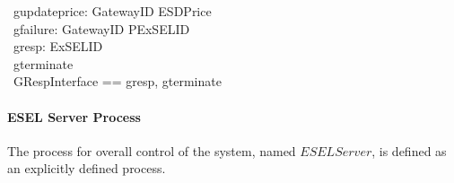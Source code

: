


\begin{circus}
	\circchannel\ gupdateprice: GatewayID \cross ESDPrice \\
	\circchannel\ gfailure: GatewayID \cross PExSELID \\
	\circchannel\ gresp: ExSELID \\
	\circchannel\ gterminate \\
    \circchannelset\ GRespInterface == \lchanset gresp, gterminate \rchanset
\end{circus}

\paragraph{ESEL Server Process}
The process for overall control of the system, named $ESELServer$, is defined as an explicitly defined process.

